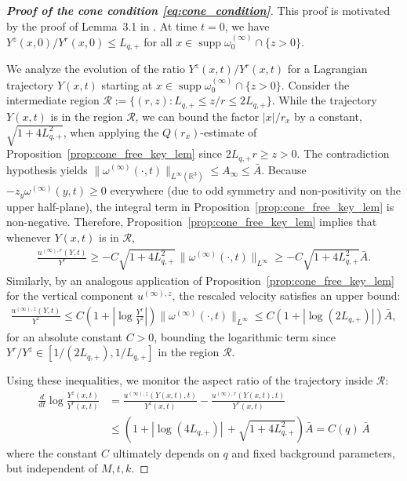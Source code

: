 \documentclass[reqno,11pt]{amsart}
\newcommand{\supp}{\operatorname{supp}}
\begin{document}
\begin{proof}[\textbf{Proof of the cone condition \eqref{eq:cone_condition}}] 
This proof is motivated by the proof of Lemma~3.1 in \cite{KimJeong22}.
At time $t=0$, we have $Y^z(x,0)/Y^r(x,0) \le L_{q,+}$ for all $x \in \supp \omega_0^{(\infty)} \cap \{z>0\}$.

We analyze the evolution of the ratio $Y^z(x,t)/Y^r(x,t)$ for a Lagrangian trajectory $Y(x,t)$ starting at $x \in \supp \omega_0 ^{(\infty)}\cap \{z>0\}$. 
Consider the intermediate region $\mathcal{R} := \{ (r,z) : L_{q,+} \le z/r \le 2L_{q,+} \}$.
While the trajectory $Y(x,t)$ is in the region $\mathcal{R}$, we can bound the factor $|x|/r_x$ by a constant, $\sqrt{1+4L_{q,+}^2}$, when applying the $Q(r_x)$-estimate of Proposition~\ref{prop:cone_free_key_lem} since $2L_{q,+}r \ge z > 0$.
The contradiction hypothesis yields $\|\omega^{(\infty)}(\cdot,t)\|_{L^\infty(\mathbb{R}^3)} \le A_\infty \le \bar A$. 
Because $-z_y \omega^{(\infty)}(y,t) \ge 0$ everywhere (due to odd symmetry and non-positivity on the upper half-plane), the integral term in Proposition~\ref{prop:cone_free_key_lem} is non-negative.
Therefore, 
Proposition~\ref{prop:cone_free_key_lem} implies that whenever $Y(x,t)$ is in $\mathcal{R}$,
\begin{align*}
    \frac{u^{(\infty),r}(Y,t)}{Y^r} \ge -C \sqrt{1+4L_{q,+}^2} \,\|\omega^{(\infty)}(\cdot,t)\|_{L^\infty} \ge -C\sqrt{1+4L_{q,+}^2} \bar A.
\end{align*}
Similarly, by an analogous application of Proposition~\ref{prop:cone_free_key_lem} for the vertical component $u^{(\infty),z}$, the rescaled velocity  satisfies an upper bound:
\begin{align*}
    \frac{u^{(\infty),z}(Y,t)}{Y^z} \le C \left(1 + \left| \log \frac{Y^r}{Y^z}  \right| \right) \|\omega^{(\infty)}(\cdot,t)\|_{L^\infty} \le C (1+|\log (2L_{q,+})|) \bar A,
\end{align*}
for an absolute constant $C>0$, bounding the logarithmic term since $Y^r/Y^z \in [1/(2L_{q,+}), 1/L_{q,+}]$  in the region $\mathcal{R}$.


Using these inequalities, we monitor the aspect ratio of the trajectory inside $\mathcal{R}$:
\begin{align*}
    \frac{d}{dt} \log \frac{Y^z(x,t)}{Y^r(x,t)} 
    &= \frac{u^{(\infty),z}(Y(x,t),t)}{Y^z(x,t)} - \frac{u^{(\infty),r}(Y(x,t),t)}{Y^r(x,t)}
    \\
    &\le \left(1+|\log (4L_{q,+})|\, + \sqrt{1+4L_{q,+}^2}\right)\bar A 
    = C(q)\, \bar A
\end{align*}
where the constant $C$ ultimately depends on $q$ and fixed background parameters, but independent of $M,t,k$.


\end{proof}
\end{document}
